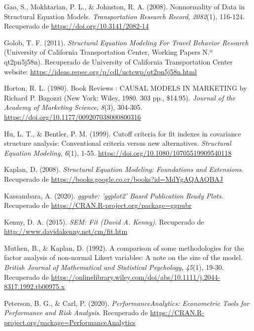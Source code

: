 \documentclass[
]{article}
\begin{document}
\leavevmode\hypertarget{ref-gao}{}%
Gao, S., Mokhtarian, P. L., \& Johnston, R. A. (2008). Nonnormality of
Data in Structural Equation Models. \emph{Transportation Research
Record}, \emph{2082}(1), 116-124. Recuperado de
\href{\%20https://doi.org/10.3141/2082-14}{https://doi.org/10.3141/2082-14}

\leavevmode\hypertarget{ref-golob}{}%
Golob, T. F. (2011). \emph{Structural Equation Modeling For Travel
Behavior Research} (University of California Transportation Center,
Working Papers N.º qt2pn5j58n). Recuperado de University of California
Transportation Center website:
\url{https://ideas.repec.org/p/cdl/uctcwp/qt2pn5j58n.html}

\leavevmode\hypertarget{ref-bagozzi}{}%
Horton, R. L. (1980). Book Reviews : CAUSAL MODELS IN MARKETING by
Richard P. Bagozzi (New York: Wiley, 1980. 303 pp., \$14.95).
\emph{Journal of the Academy of Marketing Science}, \emph{8}(3),
304-305. \url{https://doi.org/10.1177/009207038000800316}

\leavevmode\hypertarget{ref-Hu1999}{}%
Hu, L. T., \& Bentler, P. M. (1999). Cutoff criteria for fit indexes in
covariance structure analysis: Conventional criteria versus new
alternatives. \emph{Structural Equation Modeling}, \emph{6}(1), 1-55.
\url{https://doi.org/10.1080/10705519909540118}

\leavevmode\hypertarget{ref-kaplan}{}%
Kaplan, D. (2008). \emph{Structural Equation Modeling: Foundations and
Extensions}. Recuperado de
\url{https://books.google.co.cr/books?id=MdYgAQAAQBAJ}

\leavevmode\hypertarget{ref-ggpubr}{}%
Kassambara, A. (2020). \emph{ggpubr: 'ggplot2' Based Publication Ready
Plots}. Recuperado de \url{https://CRAN.R-project.org/package=ggpubr}

\leavevmode\hypertarget{ref-Kenny2015}{}%
Kenny, D. A. (2015). \emph{SEM: Fit (David A. Kenny)}. Recuperado de
\url{http://www.davidakenny.net/cm/fit.htm}

\leavevmode\hypertarget{ref-muthen}{}%
Muthen, B., \& Kaplan, D. (1992). A comparison of some methodologies for
the factor analysis of non-normal Likert variables: A note on the size
of the model. \emph{British Journal of Mathematical and Statistical
Psychology}, \emph{45}(1), 19-30. Recuperado de
\url{https://onlinelibrary.wiley.com/doi/abs/10.1111/j.2044-8317.1992.tb00975.x}

\leavevmode\hypertarget{ref-PerformanceAnalytics}{}%
Peterson, B. G., \& Carl, P. (2020). \emph{PerformanceAnalytics:
Econometric Tools for Performance and Risk Analysis}. Recuperado de
\url{https://CRAN.R-project.org/package=PerformanceAnalytics}
\end{document}
